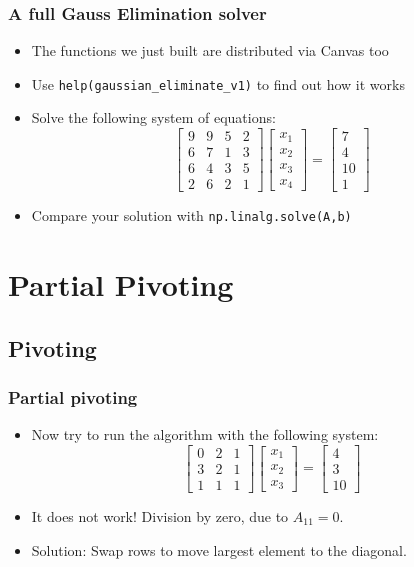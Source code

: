 \begin{frame}[fragile]
  \frametitle{A full Gauss Elimination solver}
  \begin{itemize}
    \item The functions we just built are distributed via Canvas too
    \item Use \lstinline$help(gaussian_eliminate_v1)$ to find out how it works
    \item Solve the following system of equations:
    \[
    \begin{bmatrix}
      9 & 9 & 5 & 2\\ 
      6 & 7 & 1 & 3\\ 
      6 & 4 & 3 & 5\\
      2 & 6 & 2 & 1
    \end{bmatrix}
    \begin{bmatrix}x_1\\x_2\\x_3\\x_4\end{bmatrix} = 
    \begin{bmatrix}7\\4\\10\\1\end{bmatrix}
  \]
  \item Compare your solution with \lstinline$np.linalg.solve(A,b)$
  \end{itemize}
\end{frame}

\section{Partial Pivoting}
\subsection*{Pivoting}

\begin{frame}[fragile]
  \frametitle{Partial pivoting}
  \begin{itemize}
    \item Now try to run the algorithm with the following system:
    \[
    \begin{bmatrix}
      0 & 2 & 1\\ 
      3 & 2 & 1 \\ 
      1 & 1 & 1
    \end{bmatrix}
    \begin{bmatrix}x_1\\x_2\\x_3\end{bmatrix} = 
    \begin{bmatrix}4\\3\\10\end{bmatrix}
  \]
  \pause
  \item It does not work! Division by zero, due to $A_{11}=0$.
  \item Solution: Swap rows to move largest element to the diagonal.
  \end{itemize}
\end{frame}

